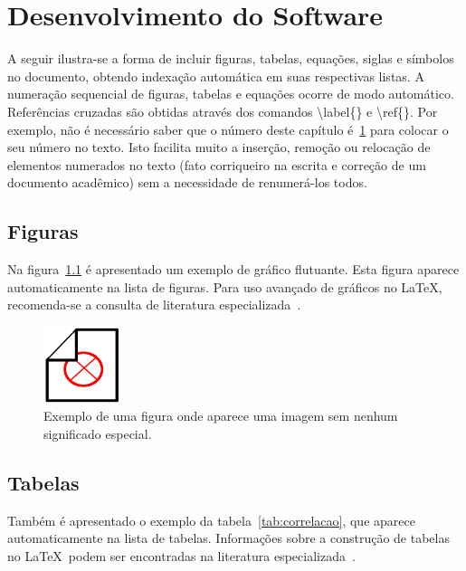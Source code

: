 \chapter{Desenvolvimento do Software}
\label{chap:desenv}

A seguir ilustra-se a forma de incluir figuras, tabelas, equa\c{c}\~oes, siglas e s\'imbolos no documento, obtendo indexa\c{c}\~ao autom\'atica em suas respectivas listas. A numera\c{c}\~ao sequencial de figuras, tabelas e equa\c{c}\~oes ocorre de modo autom\'atico. Refer\^encias cruzadas s\~ao obtidas atrav\'es dos comandos {\ttfamily \textbackslash label\{\}} e {\ttfamily \textbackslash ref\{\}}. Por exemplo, n\~ao \'e necess\'ario saber que o n\'umero deste cap\'itulo \'e~\ref{chap:desenv} para colocar o seu n\'umero no texto. Isto facilita muito a inser\c{c}\~ao, remo\c{c}\~ao ou reloca\c{c}\~ao de elementos numerados no texto (fato corriqueiro na escrita e corre\c{c}\~ao de um documento acad\^emico) sem a necessidade de renumer\'a-los todos.

\section{Figuras}

Na figura~\ref{fig:dummy} \'e apresentado um exemplo de gr\'afico flutuante. Esta figura aparece automaticamente na lista de figuras. Para uso avan\c{c}ado de gr\'aficos no \LaTeX, recomenda-se a consulta de literatura especializada~\cite{Goossens2007}.


\begin{figure}[!htb]
	\centering
	\includegraphics[width=0.2\textwidth]{./dummy.png} %
	\caption[Exemplo de uma figura]{Exemplo de uma figura onde aparece uma imagem sem nenhum significado especial.}
	\label{fig:dummy}
\end{figure}


\section{Tabelas}

Tamb\'em \'e apresentado o exemplo da tabela~\ref{tab:correlacao}, que aparece automaticamente na lista de tabelas. Informa\c{c}\~oes sobre a constru\c{c}\~ao de tabelas no \LaTeX\ podem ser encontradas na literatura especializada~\cite{Lamport1986,Buerger1989,Kopka2003,Mittelbach2004}.

